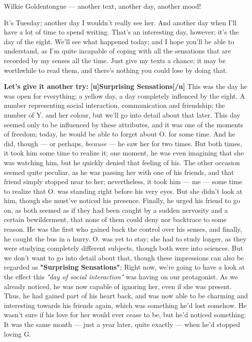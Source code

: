 Wilkie Goldentongue --- another text, another day, another mood!

It's Tuesday; another day I wouldn't really see her. And another day when I'll have a lot of time to spend writing. 
That's an interesting day, however; it's the day of the eight. We'll see what happened today; and I hope you'll be able to understand, as I'm quite incapable of coping with all the sensations that are recorded by my senses all the time. 
Just give my texts a chance; it may be worthwhile to read them, and there's nothing you could lose by doing that. 

\textbf{Let's give it another try:}
\textbf{[u]Surprising Sensations[/u]}
This was the day he was open for everything; a yellow day, a day completely inflenced by the eight. 
A number representing social interaction, communication and friendship; the number of Y. and her colour, but we'll go into detail about that later. 
This day seemed only to be influenced by these attributes, and it was one of the moments of freedom; today, he would be able to forget about O. for some time. 
And he did, though --- or perhaps, \emph{because} --- he saw her for two times. 
But both times, it took him some time to realize it; one moment, he was even imagining that she was watching him, but he quickly denied that feeling of his. 
The other occasion seemed quite peculiar, as he was passing her with one of his friends, and that friend simply stopped near to her; nevertheless, it took him --- me --- some time to realize that O. was standing right before his very eyes. 
But she didn't look at him, though she must've noticed his presence. 
Finally, he urged his friend to go on, as both seemed as if they had been caught by a sudden nervosity and a certain bewilderment, that none of them could deny nor backtrace to some reason. 
He was the first who gained back the control over his senses, and finally, he caught the bus in a hurry. 
O. was yet to stay; she had to study longer, as they were studying completely different subjects, though both were into sciences. 
But we don't want to go into detail about that, though these impressions can also be regarded as \textbf{"Surprising Sensations"}; Right now, we're going to have a look at the effect this \emph{"day of social interaction"} was having on our protagonist. 
As we already noticed, he was now capable of ignoring her, even if she was present. 
Thus, he had gained part of his heart back, and was now able to be charming and interesting towards his friends again, which was something he'd lost somehow. 
He wasn't sure if his love for her would ever cease to be, but he'd noticed something: It was the same month --- just a year later, quite exactly --- when he'd stopped loving G. 
